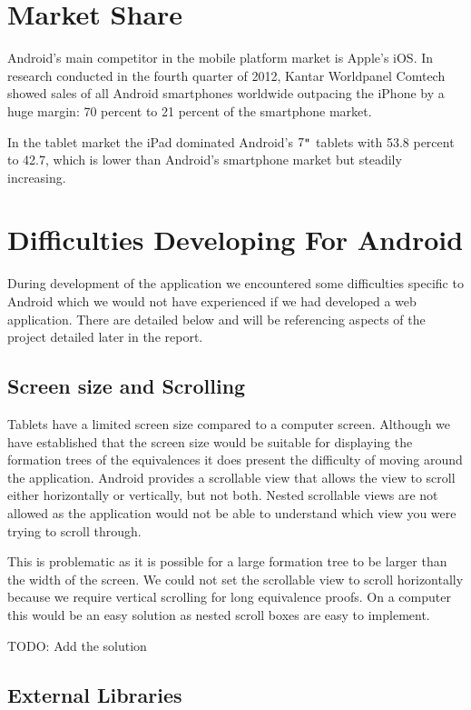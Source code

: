 \documentclass{report}
\begin{document}
\section{Market Share}

Android's main competitor in the mobile platform market is Apple's iOS. In research conducted in the fourth quarter of 2012, Kantar Worldpanel Comtech showed sales of all Android smartphones worldwide outpacing the iPhone by a huge margin: 70 percent to 21 percent of the smartphone market\cite{androidstats}.

In the tablet market the iPad dominated Android's $7\verb+"+$ tablets with 53.8 percent to 42.7, which is lower than Android's smartphone market but steadily increasing.

\section{Difficulties Developing For Android}

During development of the application we encountered some difficulties specific to Android which we would not have experienced if we had developed a web application. There are detailed below and will be referencing aspects of the project detailed later in the report.

\subsection{Screen size and Scrolling}

Tablets have a limited screen size compared to a computer screen. Although we have established that the screen size would be suitable for displaying the formation trees of the equivalences it does present the difficulty of moving around the application. Android provides a scrollable view that allows the view to scroll either horizontally or vertically, but not both. Nested scrollable views are not allowed as the application would not be able to understand which view you were trying to scroll through.

This is problematic as it is possible for a large formation tree to be larger than the width of the screen. We could not set the scrollable view to scroll horizontally because we require vertical scrolling for long equivalence proofs. On a computer this would be an easy solution as nested scroll boxes are easy to implement.

TODO: Add the solution

\subsection{External Libraries}
\end{document}
